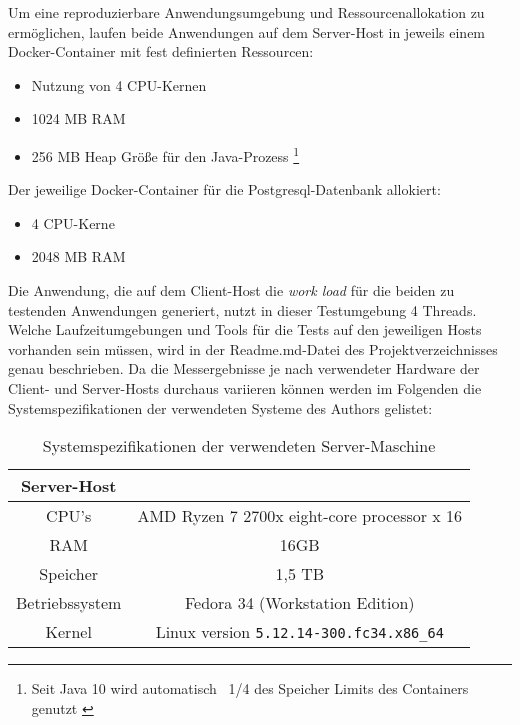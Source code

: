 Um eine reproduzierbare Anwendungsumgebung und Ressourcenallokation zu ermöglichen, laufen beide Anwendungen auf dem Server-Host in
jeweils einem Docker-Container mit fest definierten Ressourcen:
\begin{itemize}
    \item Nutzung von 4 CPU-Kernen
    \item 1024 MB RAM
    \item 256 MB Heap Größe für den Java-Prozess
          \footnote{Seit Java 10 wird automatisch ~1/4 des Speicher Limits des Containers genutzt \cite{Java10ReleaseNotes}}
\end{itemize}
Der jeweilige Docker-Container für die Postgresql-Datenbank allokiert:
\begin{itemize}
    \item 4 CPU-Kerne
    \item 2048 MB RAM
\end{itemize}

Die Anwendung, die auf dem Client-Host die \textit{work load} für die beiden zu testenden Anwendungen generiert,
nutzt in dieser Testumgebung 4 Threads.
Welche Laufzeitumgebungen und Tools für die Tests auf den jeweiligen Hosts vorhanden sein müssen,
wird in der Readme.md-Datei des Projektverzeichnisses genau beschrieben.
Da die Messergebnisse je nach verwendeter Hardware der Client- und Server-Hosts durchaus variieren können werden im Folgenden
die Systemspezifikationen der verwendeten Systeme des Authors gelistet:
\begin{table}[ht!]
    \centering
    \begin{tabular}{| c | c |}
        \hline
        Server-Host                                                  \\
        \hline
        CPU's          & AMD Ryzen 7 2700x eight-core processor x 16 \\
        \hline
        RAM            & 16GB                                        \\
        \hline
        Speicher       & 1,5 TB                                      \\
        \hline
        Betriebssystem & Fedora 34 (Workstation Edition)             \\
        \hline
        Kernel         & Linux version \verb|5.12.14-300.fc34.x86_64|    \\
        \hline
    \end{tabular}
    \caption{Systemspezifikationen der verwendeten Server-Maschine}
    \label{table:system_host}
\end{table}

